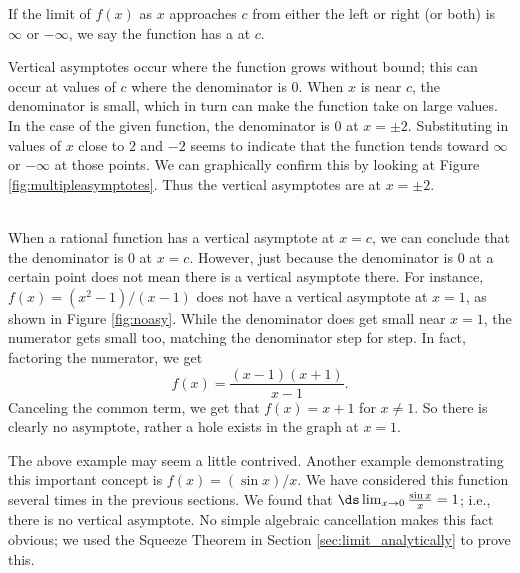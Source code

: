If the limit of $f(x)$ as $x$ approaches $c$ from either the left or right (or both) is $\infty$ or $-\infty$, we say the function has a  at $c$.\\

{Vertical asymptotes occur where the function grows without bound; this can occur at values of $c$ where the denominator is 0. When $x$ is near $c$, the denominator is small, which in turn can make the function take on large values.  In the case of the given function, the denominator is 0 at $x=\pm 2$.  Substituting in values of $x$ close to $2$ and $-2$ seems to indicate that the function tends toward $\infty$ or $-\infty$ at those points.  We can graphically confirm this by looking at Figure \ref{fig:multipleasymptotes}. Thus the vertical asymptotes are at $x=\pm2$.

}\\

When a rational function has a vertical asymptote at $x=c$, we can conclude that the denominator is 0 at $x=c$. However, just because the denominator is 0 at a certain point does not mean there is a vertical asymptote there.  For instance, $f(x)=(x^2-1)/(x-1)$ does not have a vertical asymptote at $x=1$, as shown in Figure \ref{fig:noasy}.  While the denominator does get small near $x=1$, the numerator gets small too, matching the denominator step for step. In fact, factoring the numerator, we get
$$f(x)=\frac{(x-1)(x+1)}{x-1}.$$
Canceling the common term, we get that $f(x)=x+1$ for $x\not=1$.   So there is clearly no asymptote, rather a hole exists in the graph at $x=1$.\\


The above example may seem a little contrived.  Another example demonstrating this important concept is $f(x)= (\sin x)/x$. We have considered this function several times in the previous sections. We found that $\ds \lim_{x\to0}\frac{\sin x}{x}=1$; i.e., there is no vertical asymptote. No simple algebraic cancellation makes this fact obvious; we used the Squeeze Theorem in Section \ref{sec:limit_analytically} to prove this.\\

